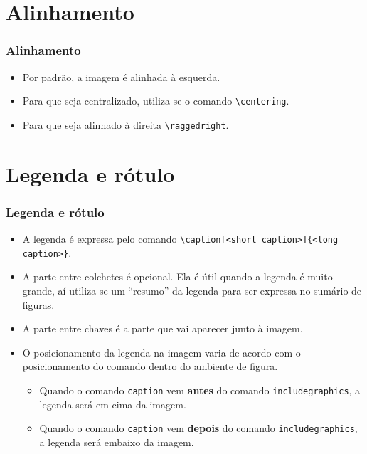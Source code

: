 \documentclass[brazilian]{beamer}
\begin{document}
\section{Alinhamento}

\begin{frame}[fragile]
    \frametitle{Alinhamento}

    \begin{itemize}
        \item Por padrão, a imagem é alinhada à esquerda.
        \item Para que seja centralizado, utiliza-se o comando \lstinline[style=myStyleLatex]!\centering!.
        \item Para que seja alinhado à direita \lstinline[style=myStyleLatex]!\raggedright!.
    \end{itemize}

\end{frame}

\section{Legenda e rótulo}
\begin{frame}[fragile]
    \frametitle{Legenda e rótulo}

    \begin{itemize}
        \item A legenda é expressa pelo comando \lstinline[style=myStyleLatex]!\caption[<short caption>]{<long caption>}!.
        \item A parte entre colchetes é opcional. Ela é útil quando a legenda é muito grande, aí utiliza-se um ``resumo'' da legenda para ser expressa no sumário de figuras.
        \item A parte entre chaves é a parte que vai aparecer junto à imagem.
        \item O posicionamento da legenda na imagem varia de acordo com o posicionamento do comando dentro do ambiente de figura.
              \begin{itemize}
                  \item Quando o comando \texttt{caption} vem \textbf{antes} do comando \texttt{includegraphics}, a legenda será em cima da imagem.
                  \item Quando o comando \texttt{caption} vem \textbf{depois} do comando \texttt{includegraphics}, a legenda será embaixo da imagem.
              \end{itemize}
    \end{itemize}

\end{frame}
\end{document}
